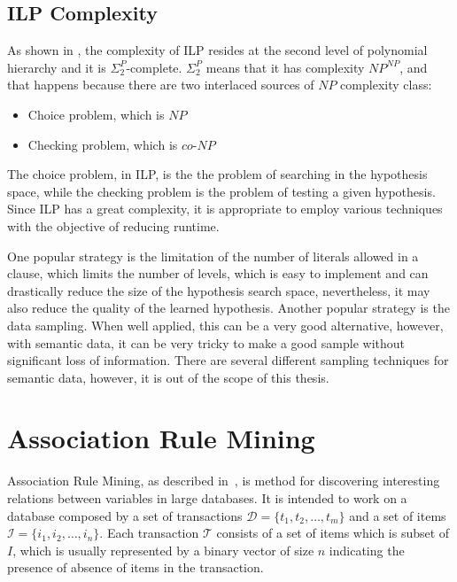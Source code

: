\subsection{ILP Complexity}

As shown in \citet{DBLP:journals/ngc/GottlobLS99}, the complexity of ILP resides at the second level of polynomial
hierarchy and it is $\Sigma_2^P$-complete. $\Sigma_2^P$ means that it has complexity $NP^{NP}$, and that happens
because there are two interlaced sources of $NP$ complexity class:
\begin{itemize}
 \item Choice problem, which is $NP$
 \item Checking problem, which is $co$-$NP$
\end{itemize}

The choice problem, in ILP, is the the problem of searching in the hypothesis space, while the checking problem is the
problem of testing a given hypothesis. Since ILP has a great complexity, it is appropriate to employ various techniques
with the objective of reducing runtime.

One popular strategy is the limitation of the number of literals allowed in a clause, which limits the number of
levels, which is easy to implement and can drastically reduce the size of the hypothesis search space, nevertheless, it
may also reduce the quality of the learned hypothesis. Another popular strategy is the data sampling. When well applied,
this can be a very good alternative, however, with semantic data, it can be very tricky to make a good sample without
significant loss of information. There are several different sampling techniques for semantic data, however, it is out
of the scope of this thesis.


\section{Association Rule Mining}
\label{sec:rw-arm}

Association Rule Mining, as described in~\citet{Agrawal:1993:MAR:170036.170072}, is method for discovering interesting
relations between variables in large databases. It is intended to work on a database composed by a set of transactions
$\mathcal{D}=\{t_1,t_2,\ldots,t_m\}$ and a set of items $\mathcal{I}=\{i_1,i_2,\ldots,i_n\}$. Each transaction
$\mathcal{T}$ consists of a set of items which is subset of $I$, which is usually represented by a binary vector of size
$n$ indicating the presence of absence of items in the
transaction.

